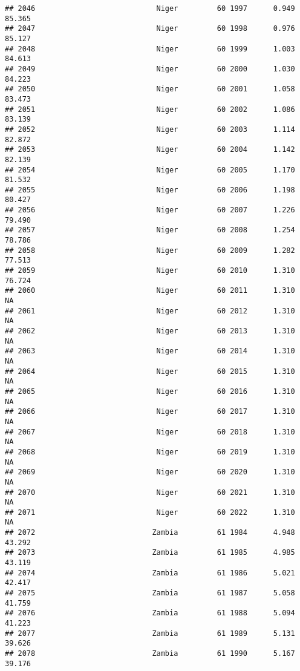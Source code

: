 \documentclass[
]{article}
\begin{document}
\begin{verbatim}
## 2046                            Niger         60 1997      0.949     85.365
## 2047                            Niger         60 1998      0.976     85.127
## 2048                            Niger         60 1999      1.003     84.613
## 2049                            Niger         60 2000      1.030     84.223
## 2050                            Niger         60 2001      1.058     83.473
## 2051                            Niger         60 2002      1.086     83.139
## 2052                            Niger         60 2003      1.114     82.872
## 2053                            Niger         60 2004      1.142     82.139
## 2054                            Niger         60 2005      1.170     81.532
## 2055                            Niger         60 2006      1.198     80.427
## 2056                            Niger         60 2007      1.226     79.490
## 2057                            Niger         60 2008      1.254     78.786
## 2058                            Niger         60 2009      1.282     77.513
## 2059                            Niger         60 2010      1.310     76.724
## 2060                            Niger         60 2011      1.310         NA
## 2061                            Niger         60 2012      1.310         NA
## 2062                            Niger         60 2013      1.310         NA
## 2063                            Niger         60 2014      1.310         NA
## 2064                            Niger         60 2015      1.310         NA
## 2065                            Niger         60 2016      1.310         NA
## 2066                            Niger         60 2017      1.310         NA
## 2067                            Niger         60 2018      1.310         NA
## 2068                            Niger         60 2019      1.310         NA
## 2069                            Niger         60 2020      1.310         NA
## 2070                            Niger         60 2021      1.310         NA
## 2071                            Niger         60 2022      1.310         NA
## 2072                           Zambia         61 1984      4.948     43.292
## 2073                           Zambia         61 1985      4.985     43.119
## 2074                           Zambia         61 1986      5.021     42.417
## 2075                           Zambia         61 1987      5.058     41.759
## 2076                           Zambia         61 1988      5.094     41.223
## 2077                           Zambia         61 1989      5.131     39.626
## 2078                           Zambia         61 1990      5.167     39.176

\end{verbatim}
\end{document}
